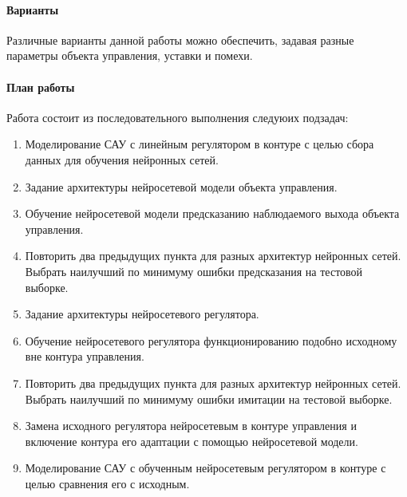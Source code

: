\paragraph{Варианты}

Различные варианты данной работы можно обеспечить, задавая разные
параметры объекта управления, уставки и помехи.

\paragraph{План работы}

Работа состоит из последовательного выполнения следуюих подзадач:
\begin{enumerate}
\item Моделирование САУ с линейным регулятором в контуре с целью сбора
  данных для обучения нейронных сетей.
\item Задание архитектуры нейросетевой модели объекта управления.
\item Обучение нейросетевой модели предсказанию наблюдаемого выхода
  объекта управления.
\item Повторить два предыдущих пункта для разных архитектур нейронных
  сетей.  Выбрать наилучший по минимуму ошибки предсказания на
  тестовой выборке.
\item Задание архитектуры нейросетевого регулятора.
\item Обучение нейросетевого регулятора функционированию подобно
  исходному вне контура управления.
\item Повторить два предыдущих пункта для разных архитектур нейронных
  сетей.  Выбрать наилучший по минимуму ошибки имитации на тестовой
  выборке.
\item Замена исходного регулятора нейросетевым в контуре управления и
  включение контура его адаптации с помощью нейросетевой модели.
\item Моделирование САУ с обученным нейросетевым регулятором в контуре
  с целью сравнения его с исходным.
\end{enumerate}

